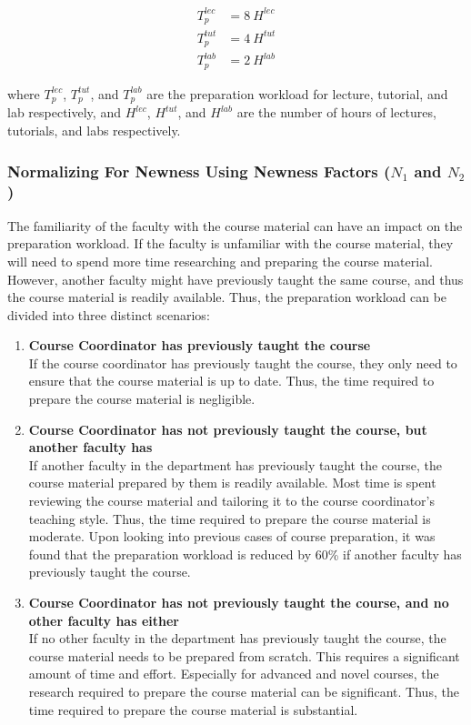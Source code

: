 \begin{equation*}
  \label{eqn:preparation-workload}
  \begin{aligned}
    T_p^{lec} & = 8\ H^{lec} \\
    T_p^{tut} & = 4\ H^{tut} \\
    T_p^{lab} & = 2\ H^{lab}
  \end{aligned}
\end{equation*}

where \(T_p^{lec}\), \(T_p^{tut}\), and \(T_p^{lab}\) are the preparation workload for lecture, tutorial, and lab respectively, and \(H^{lec}\), \(H^{tut}\), and \(H^{lab}\) are the number of hours of lectures, tutorials, and labs respectively.

\subsubsection{Normalizing For Newness Using Newness Factors (\(N_1\) and \(N_2\))}

The familiarity of the faculty with the course material can have an impact on the preparation workload. If the faculty is unfamiliar with the course material, they will need to spend more time researching and preparing the course material. However, another faculty might have previously taught the same course, and thus the course material is readily available. Thus, the preparation workload can be divided into three distinct scenarios:

\begin{enumerate}
  \item \textbf{Course Coordinator has previously taught the course}\\
        If the course coordinator has previously taught the course, they only need to ensure that the course material is up to date. Thus, the time required to prepare the course material is negligible.

  \item \textbf{Course Coordinator has not previously taught the course, but another faculty has}\\
        If another faculty in the department has previously taught the course, the course material prepared by them is readily available. Most time is spent reviewing the course material and tailoring it to the course coordinator's teaching style. Thus, the time required to prepare the course material is moderate. Upon looking into previous cases of course preparation, it was found that the preparation workload is reduced by 60\% if another faculty has previously taught the course.

  \item \textbf{Course Coordinator has not previously taught the course, and no other faculty has either}\\
        If no other faculty in the department has previously taught the course, the course material needs to be prepared from scratch. This requires a significant amount of time and effort. Especially for advanced and novel courses, the research required to prepare the course material can be significant. Thus, the time required to prepare the course material is substantial.
\end{enumerate}

